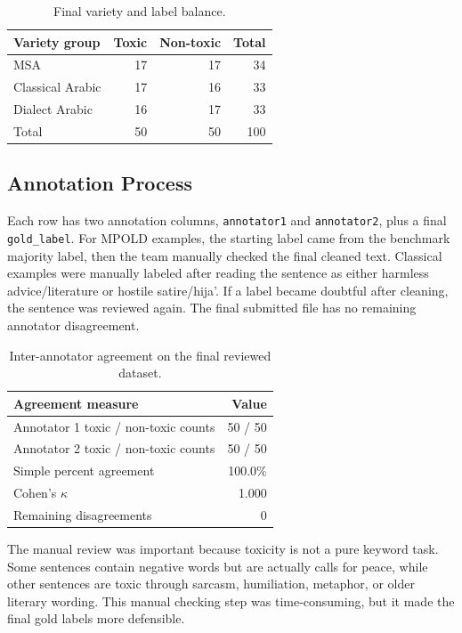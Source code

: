 \begin{table}[H]
\centering
\caption{Final variety and label balance.}
\begin{tabular}{lrrr}
\toprule
Variety group & Toxic & Non-toxic & Total \\
\midrule
MSA & 17 & 17 & 34 \\
Classical Arabic & 17 & 16 & 33 \\
Dialect Arabic & 16 & 17 & 33 \\
\midrule
Total & 50 & 50 & 100 \\
\bottomrule
\end{tabular}
\end{table}

\subsection{Annotation Process}
Each row has two annotation columns, \texttt{annotator1} and \texttt{annotator2}, plus a final \texttt{gold\_label}. For MPOLD examples, the starting label came from the benchmark majority label, then the team manually checked the final cleaned text. Classical examples were manually labeled after reading the sentence as either harmless advice/literature or hostile satire/hija'. If a label became doubtful after cleaning, the sentence was reviewed again. The final submitted file has no remaining annotator disagreement.

\begin{table}[H]
\centering
\caption{Inter-annotator agreement on the final reviewed dataset.}
\begin{tabular}{lr}
\toprule
Agreement measure & Value \\
\midrule
Annotator 1 toxic / non-toxic counts & 50 / 50 \\
Annotator 2 toxic / non-toxic counts & 50 / 50 \\
Simple percent agreement & 100.0\% \\
Cohen's $\kappa$ & 1.000 \\
Remaining disagreements & 0 \\
\bottomrule
\end{tabular}
\end{table}

The manual review was important because toxicity is not a pure keyword task. Some sentences contain negative words but are actually calls for peace, while other sentences are toxic through sarcasm, humiliation, metaphor, or older literary wording. This manual checking step was time-consuming, but it made the final gold labels more defensible.

